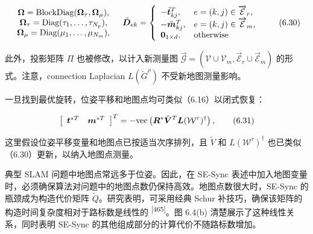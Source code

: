 \begin{equation}
\begin{array}{c} \boldsymbol {\Omega} = \text {BlockDiag} (\boldsymbol {\Omega} _ {\tau}, \boldsymbol {\Omega} _ {\mu}), \\ \boldsymbol {\Omega} _ {\tau} = \text {Diag} (\tau_ {1}, \ldots , \tau_ {N _ {p}}), \\ \boldsymbol {\Omega} _ {\mu} = \text {Diag} (\mu_ {1}, \ldots , \mu_ {N _ {m}}), \end{array} \quad \tilde {\boldsymbol {D}} _ {e k} = \left\{ \begin{array}{l l} - \tilde {\boldsymbol {t}} _ {k j} ^ {T}, & e = (k, j) \in \overrightarrow {\mathcal {E}} _ {r}, \\ - \tilde {\boldsymbol {m}} _ {k j} ^ {T}, & e = (k, j) \in \overrightarrow {\mathcal {E}} _ {m}, \\ \mathbf {0} _ {1 \times d}, & \text {otherwise} \end{array} \right.\tag{6.30}
\end{equation}

此外，投影矩阵 $\Pi$ 也被修改，以计入新测量图 $\overrightarrow { \mathcal { G } } = ( \mathcal { V } \cup \mathcal { V } _ { m } , \overrightarrow { \mathcal { E } } _ { r } \cup \overrightarrow { \mathcal { E } } _ { m } )$ 的形式。注意，connection Laplacian $L ( { \tilde { G } } ^ { \rho } )$ 不受新地图测量影响。

一旦找到最优旋转，位姿平移和地图点均可类似（6.16）以闭式恢复：

\begin{equation}
\left[ \begin{array}{c c} \boldsymbol {t} ^ {* T} & \boldsymbol {m} ^ {* T} \end{array} \right] ^ {T} = - \mathrm{vec} \left(\boldsymbol {R} ^ {*} \tilde {\boldsymbol {V}} ^ {T} \boldsymbol {L} (\mathcal {W} ^ {\tau}) ^ {\dagger}\right),\tag{6.31}
\end{equation}

这里假设位姿平移变量和地图点已按适当次序排列，且 $\tilde { V }$ 和 $L ( \mathcal { W } ^ { \tau } ) ^ { \dagger }$ 也已类似（6.30）更新，以纳入地图点测量。

典型 SLAM 问题中地图点常远多于位姿。因此，在 SE-Sync 表述中加入地图变量时，必须确保算法对问题中的地图点数仍保持高效。地图点数很大时，SE-Sync 的瓶颈成为构造代价矩阵 $\tilde { Q }$。研究表明，可采用经典 Schur 补技巧，确保该矩阵的构造时间复杂度相对于路标数是线性的 \textsuperscript{[465]}。图 6.4(b) 清楚展示了这种线性关系，同时表明 SE-Sync 的其他组成部分的计算代价不随路标数增加。

